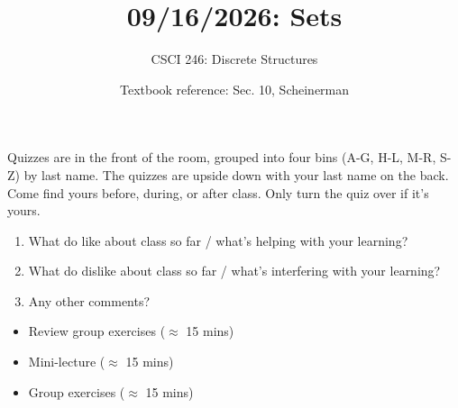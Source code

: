 \documentclass[10pt]{beamer}
\begin{document}






\title{09/16/2026: Sets}
\author{CSCI 246: Discrete Structures}
\date{Textbook reference: Sec. 10, Scheinerman}

\begin{frame}
    \titlepage 
\end{frame}


\begin{frame}
\small 
\begin{mygreenbox}[title=Graded Quiz Pickup]
Quizzes are in the front of the room, grouped into four bins (A-G, H-L, M-R, S-Z) by last name. The quizzes are upside down with your last name on the back. Come find yours before, during, or after class.  Only turn the quiz over if it's yours.
\end{mygreenbox} 
\vfill 
\begin{myredbox}[title=Early Feedback]
\begin{enumerate}
	\item What do like about class so far / what's helping with your learning?
	\item What do dislike about class so far / what's interfering with your learning?
	\item Any other comments?
\end{enumerate}
\end{myredbox}
\vfill 

\begin{myyellowbox}[title=Today's Agenda]
\begin{itemize}
	\item Review group exercises  ($\approx$ 15 mins)
	\item Mini-lecture ($\approx$ 15 mins)
	\item Group exercises ($\approx$ 15 mins)
\end{itemize}

\end{myyellowbox}
\vfill 
\end{frame}
\end{document}
